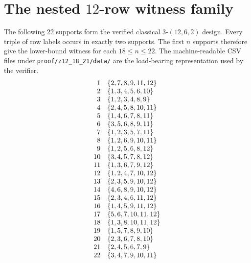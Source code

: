 \documentclass[10pt,a4paper]{amsart}
\begin{document}
\section{The nested $12$-row witness family}
\label{app:12-design}
The following 22 supports form the verified classical 3-$(12,6,2)$ design.
Every triple of row labels occurs in exactly two supports. The first $n$
supports therefore give the lower-bound witness for each $18\le n\le22$.
The machine-readable CSV files under \texttt{proof/z12\_18\_21/data/} are the
load-bearing representation used by the verifier.
\[
\begin{array}{r l}
1&\{2,7,8,9,11,12\}\\
2&\{1,3,4,5,6,10\}\\
3&\{1,2,3,4,8,9\}\\
4&\{2,4,5,8,10,11\}\\
5&\{1,4,6,7,8,11\}\\
6&\{3,5,6,8,9,11\}\\
7&\{1,2,3,5,7,11\}\\
8&\{1,2,6,9,10,11\}\\
9&\{1,2,5,6,8,12\}\\
10&\{3,4,5,7,8,12\}\\
11&\{1,3,6,7,9,12\}\\
12&\{1,2,4,7,10,12\}\\
13&\{2,3,5,9,10,12\}\\
14&\{4,6,8,9,10,12\}\\
15&\{2,3,4,6,11,12\}\\
16&\{1,4,5,9,11,12\}\\
17&\{5,6,7,10,11,12\}\\
18&\{1,3,8,10,11,12\}\\
19&\{1,5,7,8,9,10\}\\
20&\{2,3,6,7,8,10\}\\
21&\{2,4,5,6,7,9\}\\
22&\{3,4,7,9,10,11\}
\end{array}
\]
\end{document}
